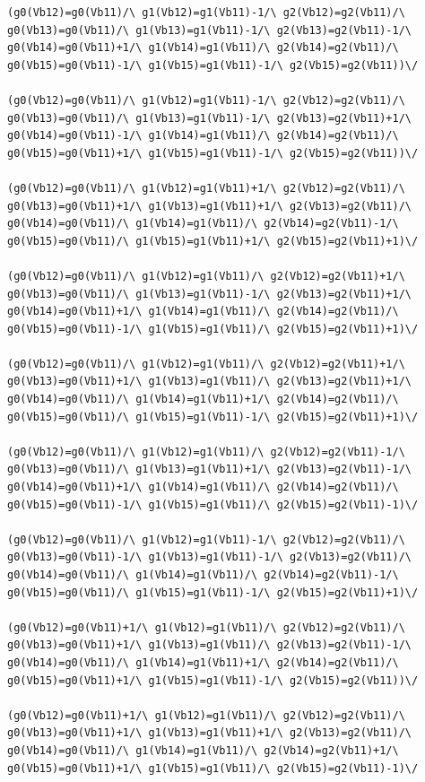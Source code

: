 \begin{lstlisting}[language=minizinc,numbers=none,caption={Encoding for 3Dblue piece1},label={lst:constraint}]
(g0(Vb12)=g0(Vb11)/\ g1(Vb12)=g1(Vb11)-1/\ g2(Vb12)=g2(Vb11)/\ g0(Vb13)=g0(Vb11)/\ g1(Vb13)=g1(Vb11)-1/\ g2(Vb13)=g2(Vb11)-1/\ g0(Vb14)=g0(Vb11)+1/\ g1(Vb14)=g1(Vb11)/\ g2(Vb14)=g2(Vb11)/\ g0(Vb15)=g0(Vb11)-1/\ g1(Vb15)=g1(Vb11)-1/\ g2(Vb15)=g2(Vb11))\/ 

(g0(Vb12)=g0(Vb11)/\ g1(Vb12)=g1(Vb11)-1/\ g2(Vb12)=g2(Vb11)/\ g0(Vb13)=g0(Vb11)/\ g1(Vb13)=g1(Vb11)-1/\ g2(Vb13)=g2(Vb11)+1/\ g0(Vb14)=g0(Vb11)-1/\ g1(Vb14)=g1(Vb11)/\ g2(Vb14)=g2(Vb11)/\ g0(Vb15)=g0(Vb11)+1/\ g1(Vb15)=g1(Vb11)-1/\ g2(Vb15)=g2(Vb11))\/ 

(g0(Vb12)=g0(Vb11)/\ g1(Vb12)=g1(Vb11)+1/\ g2(Vb12)=g2(Vb11)/\ g0(Vb13)=g0(Vb11)+1/\ g1(Vb13)=g1(Vb11)+1/\ g2(Vb13)=g2(Vb11)/\ g0(Vb14)=g0(Vb11)/\ g1(Vb14)=g1(Vb11)/\ g2(Vb14)=g2(Vb11)-1/\ g0(Vb15)=g0(Vb11)/\ g1(Vb15)=g1(Vb11)+1/\ g2(Vb15)=g2(Vb11)+1)\/ 

(g0(Vb12)=g0(Vb11)/\ g1(Vb12)=g1(Vb11)/\ g2(Vb12)=g2(Vb11)+1/\ g0(Vb13)=g0(Vb11)/\ g1(Vb13)=g1(Vb11)-1/\ g2(Vb13)=g2(Vb11)+1/\ g0(Vb14)=g0(Vb11)+1/\ g1(Vb14)=g1(Vb11)/\ g2(Vb14)=g2(Vb11)/\ g0(Vb15)=g0(Vb11)-1/\ g1(Vb15)=g1(Vb11)/\ g2(Vb15)=g2(Vb11)+1)\/ 

(g0(Vb12)=g0(Vb11)/\ g1(Vb12)=g1(Vb11)/\ g2(Vb12)=g2(Vb11)+1/\ g0(Vb13)=g0(Vb11)+1/\ g1(Vb13)=g1(Vb11)/\ g2(Vb13)=g2(Vb11)+1/\ g0(Vb14)=g0(Vb11)/\ g1(Vb14)=g1(Vb11)+1/\ g2(Vb14)=g2(Vb11)/\ g0(Vb15)=g0(Vb11)/\ g1(Vb15)=g1(Vb11)-1/\ g2(Vb15)=g2(Vb11)+1)\/ 

(g0(Vb12)=g0(Vb11)/\ g1(Vb12)=g1(Vb11)/\ g2(Vb12)=g2(Vb11)-1/\ g0(Vb13)=g0(Vb11)/\ g1(Vb13)=g1(Vb11)+1/\ g2(Vb13)=g2(Vb11)-1/\ g0(Vb14)=g0(Vb11)+1/\ g1(Vb14)=g1(Vb11)/\ g2(Vb14)=g2(Vb11)/\ g0(Vb15)=g0(Vb11)-1/\ g1(Vb15)=g1(Vb11)/\ g2(Vb15)=g2(Vb11)-1)\/ 

(g0(Vb12)=g0(Vb11)/\ g1(Vb12)=g1(Vb11)-1/\ g2(Vb12)=g2(Vb11)/\ g0(Vb13)=g0(Vb11)-1/\ g1(Vb13)=g1(Vb11)-1/\ g2(Vb13)=g2(Vb11)/\ g0(Vb14)=g0(Vb11)/\ g1(Vb14)=g1(Vb11)/\ g2(Vb14)=g2(Vb11)-1/\ g0(Vb15)=g0(Vb11)/\ g1(Vb15)=g1(Vb11)-1/\ g2(Vb15)=g2(Vb11)+1)\/ 

(g0(Vb12)=g0(Vb11)+1/\ g1(Vb12)=g1(Vb11)/\ g2(Vb12)=g2(Vb11)/\ g0(Vb13)=g0(Vb11)+1/\ g1(Vb13)=g1(Vb11)/\ g2(Vb13)=g2(Vb11)-1/\ g0(Vb14)=g0(Vb11)/\ g1(Vb14)=g1(Vb11)+1/\ g2(Vb14)=g2(Vb11)/\ g0(Vb15)=g0(Vb11)+1/\ g1(Vb15)=g1(Vb11)-1/\ g2(Vb15)=g2(Vb11))\/ 

(g0(Vb12)=g0(Vb11)+1/\ g1(Vb12)=g1(Vb11)/\ g2(Vb12)=g2(Vb11)/\ g0(Vb13)=g0(Vb11)+1/\ g1(Vb13)=g1(Vb11)+1/\ g2(Vb13)=g2(Vb11)/\ g0(Vb14)=g0(Vb11)/\ g1(Vb14)=g1(Vb11)/\ g2(Vb14)=g2(Vb11)+1/\ g0(Vb15)=g0(Vb11)+1/\ g1(Vb15)=g1(Vb11)/\ g2(Vb15)=g2(Vb11)-1)\/ 


\end{lstlisting}
